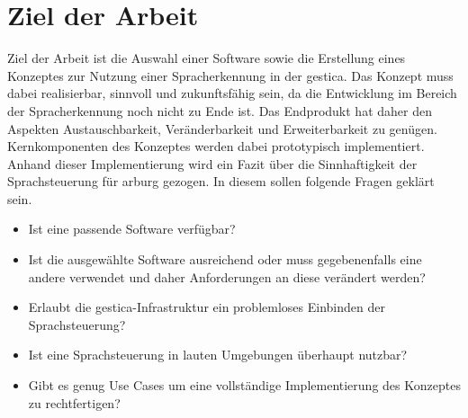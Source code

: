 \section{Ziel der Arbeit}
\label{sec:ziel}
Ziel der Arbeit ist die Auswahl einer Software sowie die Erstellung eines Konzeptes zur Nutzung einer Spracherkennung in der \gls{gestica}. Das Konzept muss dabei realisierbar, sinnvoll und zukunftsfähig sein, da die Entwicklung im Bereich der Spracherkennung noch nicht zu Ende ist. Das Endprodukt hat daher den Aspekten Austauschbarkeit, Veränderbarkeit und Erweiterbarkeit zu genügen. Kernkomponenten des Konzeptes werden dabei prototypisch implementiert. Anhand dieser Implementierung wird ein Fazit über die Sinnhaftigkeit der Sprachsteuerung für \gls{arburg} gezogen. In diesem sollen folgende Fragen geklärt sein.
\begin{itemize}
	\item Ist eine passende Software verfügbar?
	\item Ist die ausgewählte Software ausreichend oder muss gegebenenfalls eine andere verwendet und daher Anforderungen an diese verändert werden?
	\item Erlaubt die \gls{gestica}-Infrastruktur ein problemloses Einbinden der Sprachsteuerung?
	\item Ist eine Sprachsteuerung in lauten Umgebungen überhaupt nutzbar?
	\item Gibt es genug Use Cases um eine vollständige Implementierung des Konzeptes zu rechtfertigen?
\end{itemize}